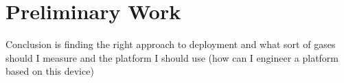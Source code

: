 \section{Preliminary Work}\label{preliminary}


Conclusion is finding the right approach to deployment and what sort of gases should I measure and the platform I should use (how can I engineer a platform based on this device)










